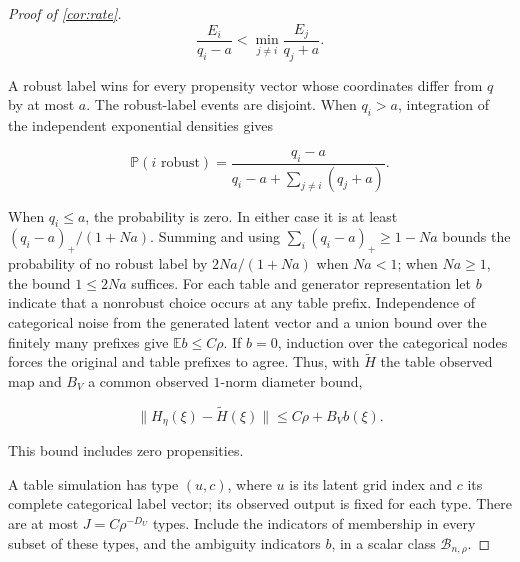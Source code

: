 \begin{proof}[Proof of \cref{cor:rate}]
\[
\frac{E_i}{q_i-a}<\min_{j\ne i}\frac{E_j}{q_j+a}.
\]

A robust label wins for every propensity vector whose coordinates differ from $q$ by at most $a$. The robust-label events are disjoint. When $q_i>a$, integration of the independent exponential densities gives

\[
\mathbb P(i\text{ robust})=\frac{q_i-a}{q_i-a+\sum_{j\ne i}(q_j+a)}.
\]

When $q_i\leqslant a$, the probability is zero. In either case it is at least $(q_i-a)_+/(1+Na)$. Summing and using $\sum_i(q_i-a)_+\geqslant1-Na$ bounds the probability of no robust label by $2Na/(1+Na)$ when $Na<1$; when $Na\geqslant1$, the bound $1\leqslant2Na$ suffices. For each table and generator representation let $b$ indicate that a nonrobust choice occurs at any table prefix. Independence of categorical noise from the generated latent vector and a union bound over the finitely many prefixes give $\mathbb E b\leqslant C\rho$. If $b=0$, induction over the categorical nodes forces the original and table prefixes to agree. Thus, with $\widetilde H$ the table observed map and $B_V$ a common observed $1$-norm diameter bound,

\[
\|H_\eta(\xi)-\widetilde H(\xi)\|\leqslant C\rho+B_V b(\xi).
\]

This bound includes zero propensities. 

A table simulation has type $(u,c)$, where $u$ is its latent grid index and $c$ its complete categorical label vector; its observed output is fixed for each type. There are at most $J=C\rho^{-D_U}$ types. Include the indicators of membership in every subset of these types, and the ambiguity indicators $b$, in a scalar class $\mathcal B_{n,\rho}$. 


\end{proof}

